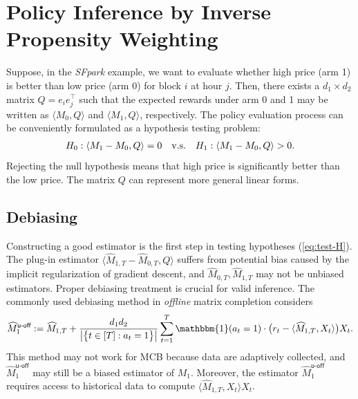 \documentclass[12pt]{article}
\def\hat{\widehat}
\def\uoff{\textsf{u-off}}
\theoremstyle{plain}
\begin{document}
\section{Policy Inference by Inverse Propensity Weighting}\label{sec:inference}
 Suppose, in the \emph{SFpark} example, we want to evaluate whether high price (arm 1) is better than low price (arm 0) for block $i$ at hour $j$. Then, there exists a $d_1\times d_2$ matrix $Q=e_ie_j^{\top}$ such that the expected rewards under arm 0 and 1 may be written as $\langle M_0, Q\rangle$ and $\langle M_1, Q\rangle$, respectively. The policy evaluation process can be conveniently formulated as a hypothesis testing problem: 
\begin{align}\label{eq:test-H}
H_0: \langle M_1-M_0, Q\rangle= 0\quad {\rm v.s.}\quad H_1: \langle M_1-M_0, Q\rangle>0.
\end{align}
Rejecting the null hypothesis means that high price is significantly better than the low price. The matrix $Q$ can represent more general linear forms. 


\subsection{Debiasing}\label{sec:debias}

Constructing a good estimator is the first step in testing hypotheses (\ref{eq:test-H}). The plug-in estimator $\langle \hat M_{1,T}-\hat M_{0, T}, Q\rangle$ suffers from potential bias caused by the implicit regularization of gradient descent, and $\hat M_{0, T}, \hat M_{1,T}$ may not be unbiased estimators.  Proper debiasing treatment is crucial for valid inference. The commonly used debiasing method \citep{chen2019inference, xia2021statistical} in \emph{offline} matrix completion considers 
\begin{align*}
\hat M_{1}^{\textsf{u-off}}:= \hat M_{1, T}+\frac{d_1d_2}{\big|\big\{t\in[T]: a_t=1 \big\}\big|}\sum_{t=1}^T \mathbbm{1}(a_t=1)\cdot \big(r_t-\langle\hat M_{1, T}, X_t \rangle\big)X_t.
\end{align*}
This method may not work for MCB because data are adaptively collected, and $\hat M_1^{\uoff}$ may still be a biased estimator of $M_{1}$. Moreover, the estimator $\hat M_1^{\uoff}$ requires access to historical data to compute $\langle \hat M_{1, T}, X_t\rangle X_t$. 
\end{document}
